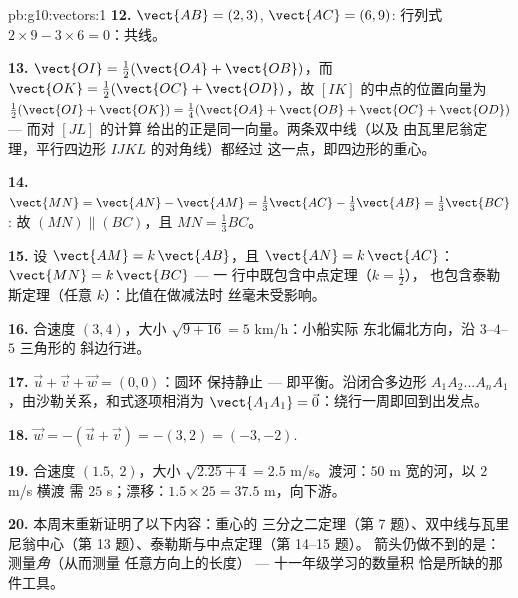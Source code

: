 \begin{solution}{pb:g10:vectors:1}
\textbf{12.} $\vect{AB} = (2, 3)$, $\vect{AC} = (6, 9)$:
行列式 $2 \times 9 - 3 \times 6 = 0$：共线。

\textbf{13.} $\vect{OI} = \frac12(\vect{OA} + \vect{OB})$，而
$\vect{OK} = \frac12(\vect{OC} + \vect{OD})$，故
$[IK]$ 的中点的位置向量为
$\frac12(\vect{OI} + \vect{OK}) = \frac14(\vect{OA} +
\vect{OB} + \vect{OC} + \vect{OD})$ --- 而对 $[JL]$ 的计算
给出的正是同一向量。两条双中线（以及
由瓦里尼翁定理，平行四边形 $IJKL$ 的对角线）都经过
这一点，即四边形的重心。

\textbf{14.} $\vect{MN} = \vect{AN} - \vect{AM} =
\frac13\vect{AC} - \frac13\vect{AB} = \frac13\vect{BC}$:
故 $(MN) \parallel (BC)$，且 $MN = \frac13 BC$。

\textbf{15.} 设 $\vect{AM} = k\,\vect{AB}$，且
$\vect{AN} = k\,\vect{AC}$：$\vect{MN} = k\,\vect{BC}$ --- 一
行中既包含中点定理（$k = \frac12$），
也包含泰勒斯定理（任意 $k$）：比值在做减法时
丝毫未受影响。

\textbf{16.} 合速度 $(3, 4)$，大小
$\sqrt{9 + 16} = 5$ km/h：小船实际
东北偏北方向，沿 $3$--$4$--$5$ 三角形的
斜边行进。

\textbf{17.} $\vec u + \vec v + \vec w = (0, 0)$：圆环
保持静止 --- 即平衡。沿闭合多边形
$A_1 A_2 \dots A_n A_1$，由沙勒关系，和式逐项相消为
$\vect{A_1 A_1} = \vec 0$：绕行一周即回到出发点。

\textbf{18.} $\vec w = -(\vec u + \vec v) = -(3, 2) =
(-3, -2)$.

\textbf{19.} 合速度 $(1.5,\ 2)$，大小
$\sqrt{2.25 + 4} = 2.5$ m/s。渡河：$50$ m 宽的河，以 $2$ m/s 横渡
需 $25$ s；漂移：$1.5 \times 25 = 37.5$ m，向下游。

\textbf{20.} 本周末重新证明了以下内容：重心的
三分之二定理（第 7 题）、双中线与瓦里尼翁中心（第
13 题）、泰勒斯与中点定理（第 14--15 题）。
箭头仍做不到的是：测量\emph{角}（从而测量
任意方向上的长度） --- 十一年级学习的数量积
恰是所缺的那件工具。
\end{solution}
